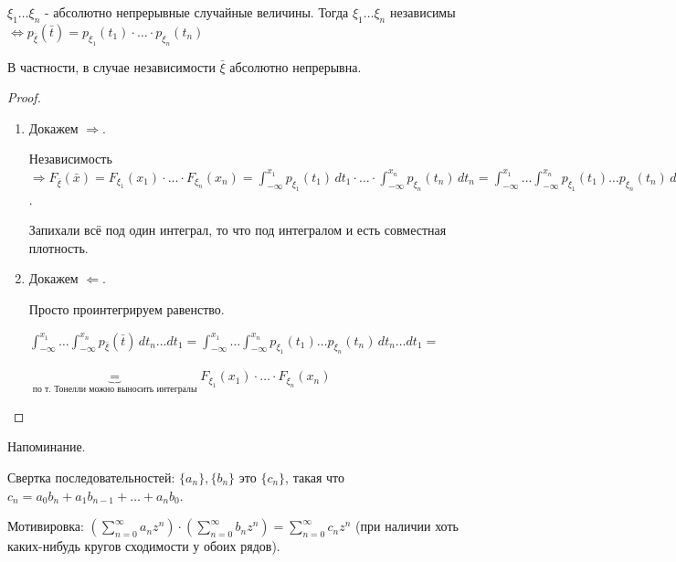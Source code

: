 \begin{consequence}
    $\xi_1 \ldots \xi_n$ - абсолютно непрерывные случайные величины. Тогда 
    $\xi_1 \ldots \xi_n$ независимы $\Longleftrightarrow p_{\bar{\xi}} (\bar{t}) = p_{\xi_1} (t_1) \cdot \ldots \cdot p_{\xi_n}(t_n)$

    В частности, в случае независимости $\bar{\xi}$ абсолютно непрерывна.
\end{consequence}

\begin{proof}
    \begin{enumerate}
        \item {
            Докажем $\Rightarrow$.
            
            Независимость $\Rightarrow F_{\bar{\xi}} (\bar{x}) = F_{\xi_1} (x_1) \cdot \ldots \cdot F_{\xi_n} (x_n) = 
            \int_{-\infty}^{x_1} p_{\xi_1} (t_1) \, dt_1 \cdot \ldots \cdot \int_{-\infty}^{x_n} p_{\xi_n} (t_n) \, dt_n = 
            \int_{-\infty}^{x_1} \ldots \int_{-\infty}^{x_n} p_{\xi_1} (t_1) \ldots p_{\xi_n} (t_n) \, dt_n \ldots dt_1$.

            Запихали всё под один интеграл, то что под интегралом и есть совместная плотность.
        }
        \item {
            Докажем $\Leftarrow$.
            
            Просто проинтегрируем равенство.
            
            $\int_{-\infty}^{x_1} \ldots \int_{-\infty}^{x_n} p_{\bar{\xi}} (\bar{t}) \, dt_n \ldots dt_1 = 
            \int_{-\infty}^{x_1} \ldots \int_{-\infty}^{x_n} p_{\xi_1} (t_1) \ldots p_{\xi_n} (t_n) \, dt_n \ldots dt_1 =$
            
            $\underbrace{=}_{\text{по т. Тонелли можно выносить интегралы}} F_{\xi_1} (x_1) \cdot \ldots \cdot F_{\xi_n} (x_n)$
        }
    \end{enumerate}
\end{proof}

\begin{remark}
    Напоминание.

    Свертка последовательностей: $\{a_n\}, \{b_n\}$ это $\{c_n\}$, такая что $c_n = a_0 b_n + a_1 b_{n - 1} + \ldots + a_n b_0$.

    Мотивировка: $\left(\sum_{n=0}^{\infty}a_n z^n\right) \cdot \left(\sum_{n = 0}^{\infty} b_n z^n\right) = \sum_{n=0}^{\infty} c_n z^n$  (при наличии хоть каких-нибудь кругов сходимости у обоих рядов).
\end{remark}

